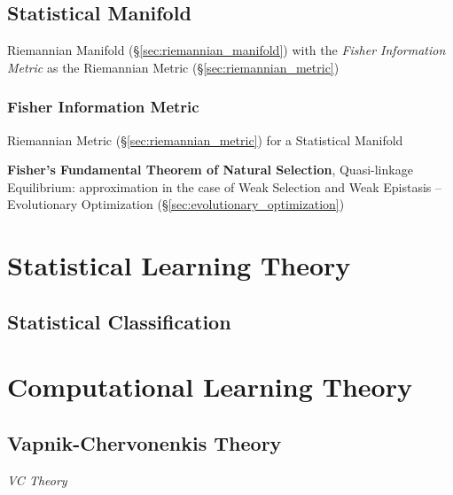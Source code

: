 \subsection{Statistical Manifold}\label{sec:statistical_manifold}

Riemannian Manifold (\S\ref{sec:riemannian_manifold}) with the
\emph{Fisher Information Metric} as the Riemannian Metric
(\S\ref{sec:riemannian_metric})



\subsubsection{Fisher Information Metric}
\label{sec:fisher_information}

Riemannian Metric (\S\ref{sec:riemannian_metric}) for a Statistical
Manifold

\fist \textbf{Fisher's Fundamental Theorem of Natural Selection},
Quasi-linkage Equilibrium: approximation in the case of Weak Selection
and Weak Epistasis -- Evolutionary Optimization
(\S\ref{sec:evolutionary_optimization}) %



\section{Statistical Learning Theory}\label{sec:statistical_learning_theory}




\subsection{Statistical Classification}\label{sec:statistical_classification}



\section{Computational Learning Theory}\label{sec:computational_learning_theory}




\subsection{Vapnik-Chervonenkis Theory}\label{sec:vc_theory}

\emph{VC Theory}
